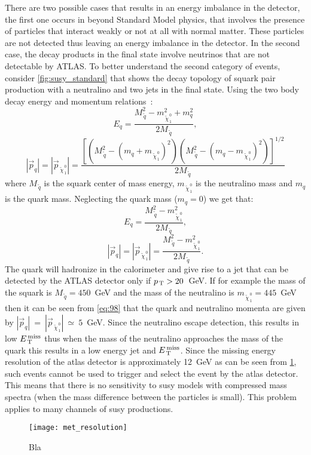 There are two possible cases that results in an energy imbalance in the
detector, the first one occurs in beyond Standard Model physics, that involves
the presence of particles that interact weakly or not at all with normal
matter. These particles are not detected thus leaving an energy imbalance in the
detector. In the second case, the decay products in the final state involve
neutrinos that are not detectable by ATLAS\@. To better understand the second
category of events, consider \cref{fig:susy_standard} that shows the decay
topology of squark pair production with a neutralino and two jets in the final
state. Using the two body decay energy and momentum relations~\cite{PDG}:
\begin{equation}
  \label{eq:95}
  E_q = \frac{M_{\, \tilde{q}}^2 - m_{\, \tilde{\chi}_{\, 1}^{\, 0}}^2 + m_q^2}{2
    M_{\, \tilde{q}}},
\end{equation}
\begin{equation}
  \label{eq:96}
  |\vec{p}_q| = |\vec{p}_{\, \tilde{\chi}_{\, 1}^{\, 0}}| = \frac{\left[ \left(
        M_{\, \tilde{q}}^2 - (m_q + m_{\, \tilde{\chi}_{\, 1}^{\, 0}})^2
      \right) \left( M_{\, \tilde{q}}^2 - (m_q - m_{\, \tilde{\chi}_{\, 1}^{\,
            0}})^2 \right) \right]^{1/2}}{2 M_{\, \tilde{q}}}
\end{equation}
where $M_{\, \tilde{q}}$ is the squark center of mass energy,
$m_{\, \tilde{\chi}_{\, 1}^{\, 0}}$ is the neutralino mass and $m_q$ is the
quark mass. Neglecting the quark mass ($m_q = 0$) we get that:
\begin{equation}
  \label{eq:97}
  E_q = \frac{M_{\, \tilde{q}}^2 - m_{\, \tilde{\chi}_{\, 1}^{\, 0}}^2}{2 M_{\,
      \tilde{q}}},
\end{equation}
\begin{equation}
  \label{eq:98}
  |\vec{p}_q| = |\vec{p}_{\, \tilde{\chi}_{\, 1}^{\, 0}}| = \frac{M_{\,
      \tilde{q}}^2 - m_{\, \tilde{\chi}_{\, 1}^{\, 0}}^2}{2 M_{\, \tilde{q}}}.
\end{equation}
The quark will hadronize in the calorimeter and give rise to a jet that can be
detected by the ATLAS detector only if $p_\mathrm{\, T} > 20$~GeV. If for example the mass
of the squark is $M_{\, \tilde{q}} = 450$~GeV and the mass of the neutralino is
$m_{\, \tilde{\chi}_{\, 1}^{\, 0}} = 445$~GeV then it can be seen from
\cref{eq:98} that the quark and neutralino momenta are given by
$|\vec{p}_q|~=~|\vec{p}_{\, \tilde{\chi}_{\, 1}^{\, 0}}|~\simeq~5$~GeV. Since
the neutralino escape detection, this results in low $E_\mathrm{\, T}^\mathrm{\, miss}$ thus when the mass
of the neutralino approaches the mass of the quark this results in a low energy
jet and $E_\mathrm{\, T}^\mathrm{\, miss}$. Since the missing energy resolution of the \gls{atlas} detector
is approximately 12~GeV as can be seen from \cref{fig:met_resolution}, such
events cannot be used to trigger and select the event by the \gls{atlas}
detector. This means that there is no sensitivity to \gls{susy} models with
compressed mass spectra (when the mass difference between the particles is
small). This problem applies to many channels of \gls{susy} productions.
\begin{figure}[!h]
  \centering
  \texttt{[image: met\_resolution]}
  \caption{Bla}
  \label{fig:met_resolution}
\end{figure}

